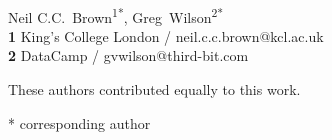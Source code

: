 \documentclass[10pt,letterpaper]{article}
\date{}
\begin{document}
\vspace*{0.2in}

\begin{flushleft}
{\Large
\textbf{} %
}
\newline
\\
{Neil C.C.\ Brown}\textsuperscript{1{\ddag}*},
{Greg~Wilson}\textsuperscript{2{\ddag}*}
\\
\bigskip
\textbf{1} King's College London / neil.c.c.brown@kcl.ac.uk \\
\textbf{2} DataCamp / gvwilson@third-bit.com \\

\bigskip

%
%
{\ddag} These authors contributed equally to this work.





* corresponding author

\end{flushleft}


\end{document}
